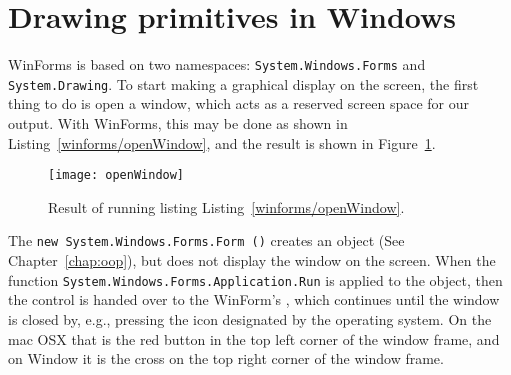 \section{Drawing primitives in Windows}
WinForms is based on two namespaces: \lstinline!System.Windows.Forms! and \lstinline!System.Drawing!. To start making a graphical display on the screen, the first thing to do is open a window, which acts as a reserved screen space for our output. With WinForms, this may be done as shown in Listing~\ref{winforms/openWindow}, and the result is shown in Figure~\ref{fig:openWindow}.
%
%
\begin{figure}
  \centering
  \texttt{[image: openWindow]}
  \caption{Result of running listing Listing~\ref{winforms/openWindow}.}
  \label{fig:openWindow}
\end{figure}
The \lstinline!new System.Windows.Forms.Form ()! creates an object (See Chapter~\ref{chap:oop}), but does not display the window on the screen. When the function \lstinline!System.Windows.Forms.Application.Run! is applied to the object, then the control is handed over to the WinForm's , which continues until the window is closed by, e.g., pressing the icon designated by the operating system. On the mac OSX that is the red button in the top left corner of the window frame, and on Window it is the cross on the top right corner of the window frame.

